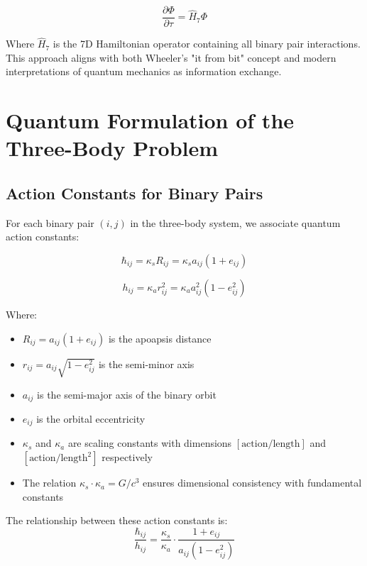 \documentclass{article}
\begin{document}
\begin{equation}
\frac{\partial \Phi}{\partial \tau} = \hat{H}_7 \Phi
\end{equation}

Where $\hat{H}_7$ is the 7D Hamiltonian operator containing all binary pair interactions. This approach aligns with both Wheeler's "it from bit" concept and modern interpretations of quantum mechanics as information exchange.

\section{Quantum Formulation of the Three-Body Problem}

\subsection{Action Constants for Binary Pairs}

For each binary pair $(i,j)$ in the three-body system, we associate quantum action constants:

\begin{equation}
\hbar_{ij} = \kappa_s R_{ij} = \kappa_s a_{ij}(1+e_{ij})
\end{equation}

\begin{equation}
h_{ij} = \kappa_a r_{ij}^2 = \kappa_a a_{ij}^2(1-e_{ij}^2)
\end{equation}

Where:
\begin{itemize}
\item $R_{ij} = a_{ij}(1+e_{ij})$ is the apoapsis distance
\item $r_{ij} = a_{ij}\sqrt{1-e_{ij}^2}$ is the semi-minor axis
\item $a_{ij}$ is the semi-major axis of the binary orbit
\item $e_{ij}$ is the orbital eccentricity
\item $\kappa_s$ and $\kappa_a$ are scaling constants with dimensions $[\text{action}/\text{length}]$ and $[\text{action}/\text{length}^2]$ respectively
\item The relation $\kappa_s \cdot \kappa_a = G/c^3$ ensures dimensional consistency with fundamental constants
\end{itemize}

The relationship between these action constants is:
\begin{equation}
\frac{\hbar_{ij}}{h_{ij}} = \frac{\kappa_s}{\kappa_a} \cdot \frac{1+e_{ij}}{a_{ij}(1-e_{ij}^2)}
\end{equation}
\end{document}
